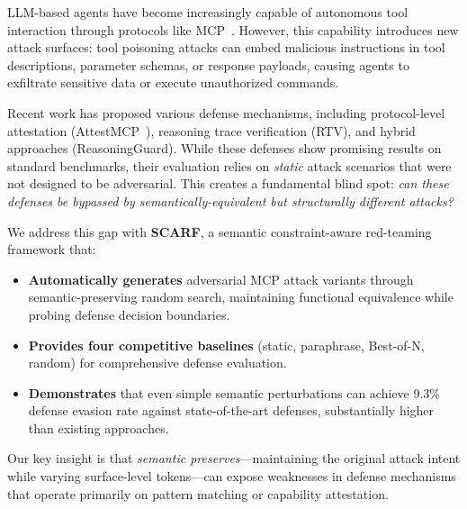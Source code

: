 LLM-based agents have become increasingly capable of autonomous tool interaction through protocols like MCP~\cite{wang2026mcptox}. 
However, this capability introduces new attack surfaces: tool poisoning attacks can embed malicious instructions in tool descriptions, parameter schemas, or response payloads, causing agents to exfiltrate sensitive data or execute unauthorized commands.

Recent work has proposed various defense mechanisms, including protocol-level attestation (AttestMCP~\cite{maloyan2026breaking}), reasoning trace verification (RTV), and hybrid approaches (ReasoningGuard). 
While these defenses show promising results on standard benchmarks, their evaluation relies on \textit{static} attack scenarios that were not designed to be adversarial. 
This creates a fundamental blind spot: \textit{can these defenses be bypassed by semantically-equivalent but structurally different attacks?}

We address this gap with \textbf{SCARF}, a semantic constraint-aware red-teaming framework that:

\begin{itemize}
    \item \textbf{Automatically generates} adversarial MCP attack variants through semantic-preserving random search, maintaining functional equivalence while probing defense decision boundaries.
    \item \textbf{Provides four competitive baselines} (static, paraphrase, Best-of-N, random) for comprehensive defense evaluation.
    \item \textbf{Demonstrates} that even simple semantic perturbations can achieve 9.3\% defense evasion rate against state-of-the-art defenses, substantially higher than existing approaches.
\end{itemize}

Our key insight is that \textit{semantic preserves}---maintaining the original attack intent while varying surface-level tokens---can expose weaknesses in defense mechanisms that operate primarily on pattern matching or capability attestation.